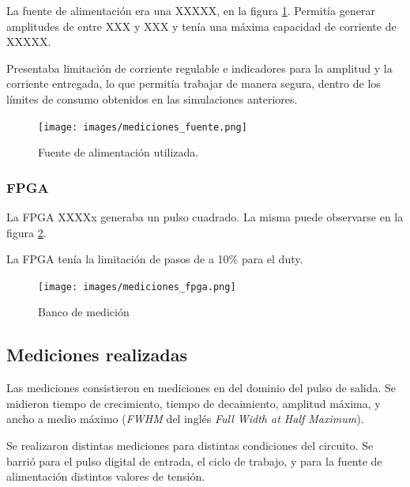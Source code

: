 La fuente de alimentación era una XXXXX, en la figura \ref{fig:mediciones_fuente}. Permitía generar amplitudes de entre
XXX y XXX y tenía una máxima capacidad de corriente de XXXXX.

Presentaba limitación de corriente regulable e indicadores para la amplitud y la
corriente entregada, lo que permitía trabajar de manera segura, dentro de los
límites de consumo obtenidos en las simulaciones anteriores.

\begin{figure}
  \centering
    \texttt{[image: images/mediciones\_fuente.png]}
    \caption{Fuente de alimentación utilizada.}
    \label{fig:mediciones_fuente}
\end{figure}


\subsubsection{FPGA}

La FPGA XXXXx generaba un pulso cuadrado. La misma puede observarse en la figura
\ref{fig:mediciones_fpga}.

La FPGA tenía la limitación de pasos de a 10\% para el duty.

\begin{figure}
  \centering
    \texttt{[image: images/mediciones\_fpga.png]}
    \caption{Banco de medición}
    \label{fig:mediciones_fpga}
\end{figure}


\subsection{Mediciones realizadas}

Las mediciones consistieron en mediciones en del dominio del pulso de salida. Se
midieron tiempo de crecimiento, tiempo de decaimiento, amplitud máxima, y ancho
a medio máximo (\textit{FWHM} del inglés \textit{Full Width at Half Maximum}).

Se realizaron distintas mediciones para distintas condiciones del circuito. Se
barrió para el pulso digital de entrada, el ciclo de trabajo, y para la fuente
de alimentación distintos valores de tensión.

